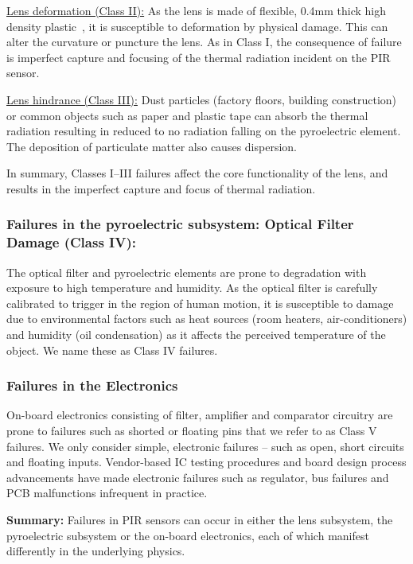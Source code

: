 \noindent \underline{Lens deformation (Class II):} As the lens is made of flexible, 0.4mm thick high density plastic~\cite{fresnel}, it is susceptible to deformation by physical damage. This can alter the curvature or puncture the lens. %
As in Class I, the consequence of failure is imperfect capture and focusing of the thermal radiation incident on the PIR sensor.

\noindent \underline{Lens hindrance (Class III):} Dust particles (\eg factory floors, building construction) or common objects such as paper and plastic tape can absorb the thermal radiation resulting in reduced to no radiation falling on the pyroelectric element. The deposition of particulate matter also causes dispersion.

In summary, Classes I--III failures affect the core functionality of the lens, and results in the imperfect capture and focus of thermal radiation.

\subsubsection{\textbf{Failures in the pyroelectric subsystem}: Optical Filter Damage (Class IV):} %
The optical filter and pyroelectric elements are prone to degradation with exposure to high temperature and humidity. As the optical filter is carefully calibrated to trigger in the region of human motion, it is susceptible to damage due to environmental factors such as heat sources (\eg room heaters, air-conditioners) and humidity (\eg oil condensation) as it affects the perceived temperature of the object. We name these as Class IV failures.

\subsubsection{\textbf{Failures in the Electronics}} On-board electronics consisting of filter, amplifier and comparator circuitry are prone to failures such as shorted or floating pins that we refer to as Class V failures. We only consider simple, electronic failures -- such as open, short circuits and floating inputs. Vendor-based IC testing procedures and board design process advancements have made electronic failures such as regulator, bus failures and PCB malfunctions infrequent in practice.



\noindent \textbf{Summary:} Failures in PIR sensors can occur in either the lens subsystem, the pyroelectric subsystem or the on-board electronics, each of which manifest differently in the underlying physics.


